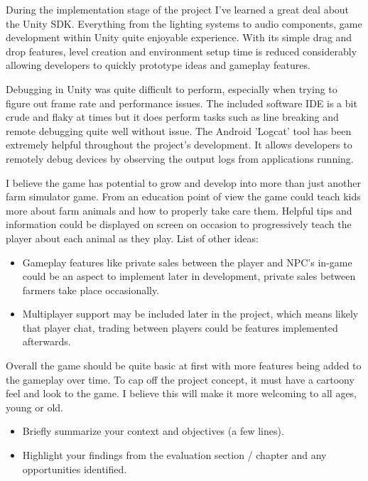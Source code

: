 During the implementation stage of the project I've learned a great deal about the Unity SDK. Everything from the lighting systems to audio components, game development within Unity quite enjoyable experience. With its simple drag and drop features, level creation and environment setup time is reduced considerably allowing developers to quickly prototype ideas and gameplay features.

Debugging in Unity was quite difficult to perform, especially when trying to figure out frame rate and performance issues. The included software IDE is a bit crude and flaky at times but it does perform tasks such as line breaking and remote debugging quite well without issue. The Android 'Logcat' tool has been extremely helpful throughout the project's development. It allows developers to remotely debug devices by observing the output logs from applications running. 

I believe the game has potential to grow and develop into more than just another farm simulator game. From an education point of view the game could teach kids more about farm animals and how to properly take care them. Helpful tips and information could be displayed on screen on occasion to progressively teach the player about each animal as they play.
List of other ideas:
\begin{itemize}
\item Gameplay features like private sales between the player and NPC's in-game could be an aspect to implement later in development, private sales between farmers take place occasionally. 
\item Multiplayer support may be included later in the project, which means likely that player chat, trading between players could be features implemented afterwards. 
\end{itemize}
Overall the game should be quite basic at first with more features being added to the gameplay over time. To cap off the project concept, it must have a cartoony feel and look to the game. I believe this will make it more welcoming to all ages, young or old.

\begin{itemize}
\item Briefly summarize your context and objectives (a few lines).
\item Highlight your findings from the evaluation section / chapter and any opportunities identified.
\end{itemize}
